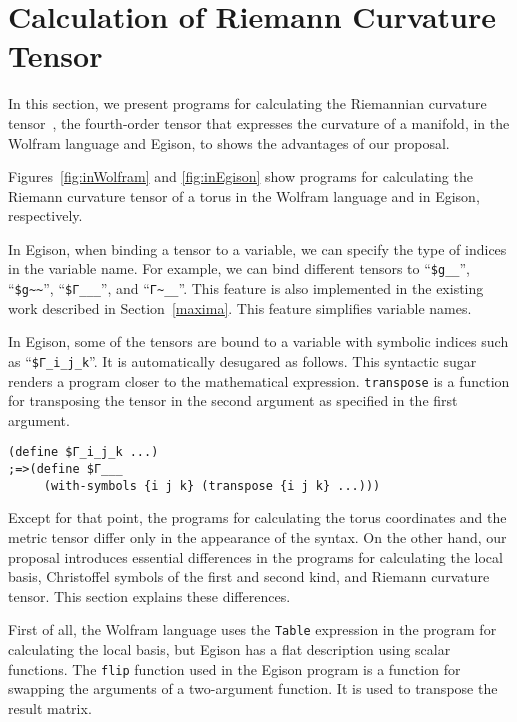 \documentclass[acmlarge]{acmart}
\begin{document}
\section{Calculation of Riemann Curvature Tensor}\label{demo}

In this section, we present programs for calculating the Riemannian curvature tensor~\cite{fleisch2011student,schutz1980geometrical,ollivier2011visual}, the fourth-order tensor that expresses the curvature of a manifold, in the Wolfram language and Egison, to shows the advantages of our proposal.

Figures~\ref{fig:inWolfram} and \ref{fig:inEgison} show programs for calculating the Riemann curvature tensor of a torus in the Wolfram language and in Egison, respectively.

In Egison, when binding a tensor to a variable, we can specify the type of indices in the variable name.
For example, we can bind different tensors to ``\verb|$g__|'', ``\verb|$g~~|'', ``\verb|$Γ___|'', and ``\verb|Γ~__|''.
This feature is also implemented in the existing work described in Section~\ref{maxima}.
This feature simplifies variable names.

In Egison, some of the tensors are bound to a variable with symbolic indices such as ``\verb|$Γ_i_j_k|''.
It is automatically desugared as follows.
This syntactic sugar renders a program closer to the mathematical expression.
\texttt{transpose} is a function for transposing the tensor in the second argument as specified in the first argument.

{\footnotesize
\begin{verbatim}
(define $Γ_i_j_k ...)
;=>(define $Γ___
     (with-symbols {i j k} (transpose {i j k} ...)))
\end{verbatim}
}

Except for that point, the programs for calculating the torus coordinates and the metric tensor differ only in the appearance of the syntax.
On the other hand, our proposal introduces essential differences in the programs for calculating the local basis, Christoffel symbols of the first and second kind, and Riemann curvature tensor.
This section explains these differences.

First of all, the Wolfram language uses the \texttt{Table} expression in the program for calculating the local basis, but Egison has a flat description using scalar functions.
The \texttt{flip} function used in the Egison program is a function for swapping the arguments of a two-argument function.
It is used to transpose the result matrix.
\end{document}
